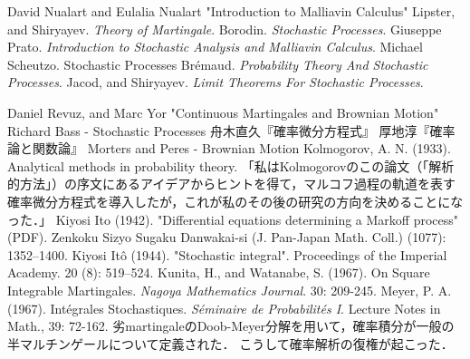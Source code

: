 \documentclass[uplatex,dvipdfmx]{jsreport}
\begin{document}
\begin{thebibliography}{99}
    David Nualart and Eulalia Nualart "Introduction to Malliavin Calculus"
    Lipster, and Shiryayev. \textit{Theory of Martingale}.
    Borodin. \textit{Stochastic Processes}.
    Giuseppe Prato. \textit{Introduction to Stochastic Analysis and Malliavin Calculus}.
    Michael Scheutzo. Stochastic Processes
    Brémaud. \textit{Probability Theory And Stochastic Processes}.
    Jacod, and Shiryayev. \textit{Limit Theorems For Stochastic Processes}.


    Daniel Revuz, and Marc Yor "Continuous Martingales and Brownian Motion"
    Richard Bass - Stochastic Processes
    舟木直久『確率微分方程式』
    厚地淳『確率論と関数論』
    Morters and Peres - Brownian Motion
    Kolmogorov, A. N. (1933). Analytical methods in probability theory. 「私はKolmogorovのこの論文（「解析的方法」）の序文にあるアイデアからヒントを得て，マルコフ過程の軌道を表す確率微分方程式を導入したが，これが私のその後の研究の方向を決めることになった．」
    Kiyosi Ito (1942). "Differential equations determining a Markoff process" (PDF). Zenkoku Sizyo Sugaku Danwakai-si (J. Pan-Japan Math. Coll.) (1077): 1352–1400.
    Kiyosi Itô (1944). "Stochastic integral". Proceedings of the Imperial Academy. 20 (8): 519–524.
    Kunita, H., and Watanabe, S. (1967). On Square Integrable Martingales. \textit{Nagoya Mathematics Journal}. 30: 209-245.
    Meyer, P. A. (1967). Intégrales Stochastiques. \textit{Séminaire de Probabilités I}. Lecture Notes in Math., 39: 72-162. 劣martingaleのDoob-Meyer分解を用いて，確率積分が一般の半マルチンゲールについて定義された．
    こうして確率解析の復権が起こった．
\end{thebibliography}
\end{document}
